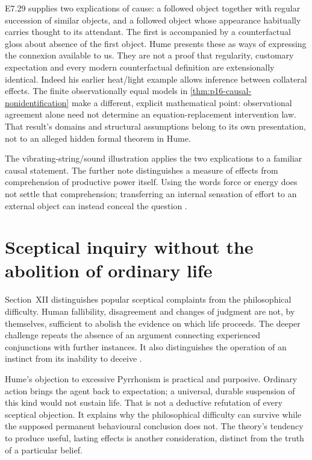 E7.29 supplies two explications of cause: a followed object together
with regular succession of similar objects, and a followed object
whose appearance habitually carries thought to its attendant.
The first is accompanied by a counterfactual gloss about absence of
the first object. Hume presents these as ways of expressing the
connexion available to us. They are not a proof that regularity,
customary expectation and every modern counterfactual definition are
extensionally identical. Indeed his earlier heat/light example allows
inference between collateral effects. The finite observationally equal
models in \cref{thm:p16-causal-nonidentification} make a different,
explicit mathematical point: observational agreement alone need not
determine an equation-replacement intervention law. That result's
domains and structural assumptions belong to its own presentation,
not to an alleged hidden formal theorem in Hume.

The vibrating-string/sound illustration applies the two explications
to a familiar causal statement. The further note distinguishes a
measure of effects from comprehension of productive power itself.
Using the words force or energy does not settle that comprehension;
transferring an internal sensation of effort to an external object
can instead conceal the question
\parencite[E~7.26--7.30, 7.29n17]{Hume1777EnquiryHTO}.

\section{Sceptical inquiry without the abolition of ordinary life}
\label{sec:p15-hume-scepticism}

Section~XII distinguishes popular sceptical complaints from the
philosophical difficulty. Human fallibility, disagreement and changes
of judgment are not, by themselves, sufficient to abolish the evidence
on which life proceeds. The deeper challenge repeats the absence of
an argument connecting experienced conjunctions with further instances.
It also distinguishes the operation of an instinct from its inability
to deceive \parencite[E~12.21--12.22]{Hume1777EnquiryHTO}.

Hume's objection to excessive Pyrrhonism is practical and purposive.
Ordinary action brings the agent back to expectation; a universal,
durable suspension of this kind would not sustain life. That is not
a deductive refutation of every sceptical objection. It explains why
the philosophical difficulty can survive while the supposed permanent
behavioural conclusion does not. The theory's tendency to produce
useful, lasting effects is another consideration, distinct from
the truth of a particular belief.

